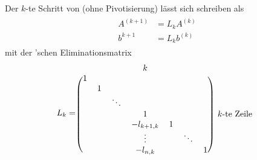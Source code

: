 Der $k$-te Schritt von  (ohne Pivotisierung) lässt sich schreiben als 
\begin{align}
	\label{3.1}
	\begin{split}
	A^{(k+1)} &= L_kA^{(k)} \\
	b^{k+1} &= L_kb^{(k)}
	\end{split}
\end{align}
mit der 'schen Eliminationsmatrix
\begin{align}
	L_k = \begin{blockarray}{cccccccc}
	 &  &  & k &  &  &  &\\
	\begin{block}{(ccccccc)c}
	1 &  &  &  &  &  &  &  \\
	 & 1 &  &  &  &  &  &  \\
	 &  & \ddots &  &  &  &  &  \\
	 &  &  & 1 &  &  &  & k\text{-te Zeile} \\
	 &  &  & -l_{k+1,k} & 1 &  &  &  \\
	 &  &  & \vdots &  & \ddots &  &  \\
	 &  &  & -l_{n,k} &  &  & 1 &  \\
	\end{block}
	\end{blockarray}\notag
\end{align}

